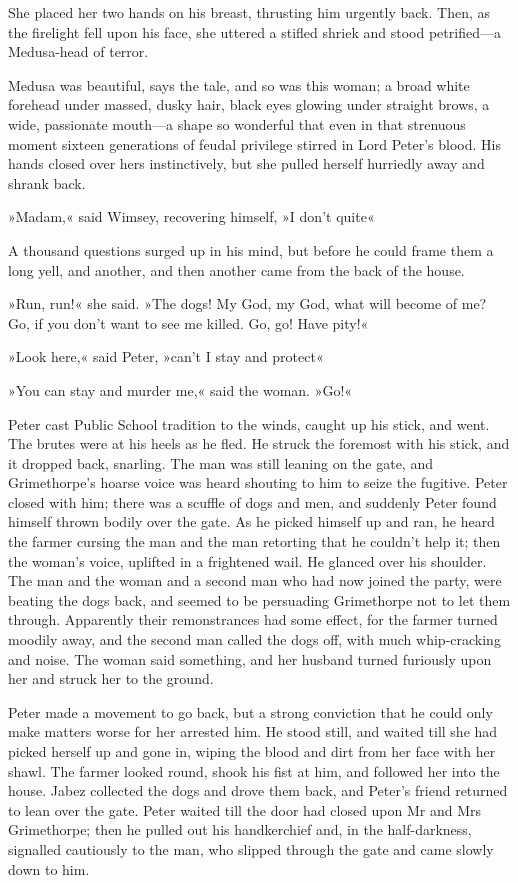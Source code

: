She placed her two hands on his breast, thrusting him urgently back.  Then, as the firelight fell upon his face, she uttered a stifled shriek and stood petrified—a Medusa-head of terror.

Medusa was beautiful, says the tale, and so was this woman; a broad white forehead under massed, dusky hair, black eyes glowing under straight brows, a wide, passionate mouth—a shape so wonderful that even in that strenuous moment sixteen generations of feudal privilege stirred in Lord Peter's blood. His hands closed over hers instinctively, but she pulled herself hurriedly away and shrank back.

»Madam,« said Wimsey, recovering himself, »I don't quite\longdash«

A thousand questions surged up in his mind, but before he could frame them a long yell, and another, and then another came from the back of the house.

»Run, run!« she said. »The dogs! My God, my God, what will become of me? Go, if you don't want to see me killed. Go, go! Have pity!«

»Look here,« said Peter, »can't I stay and protect\longdash«

»You can stay and murder me,« said the woman. »Go!«

Peter cast Public School tradition to the winds, caught up his stick, and went. The brutes were at his heels as he fled. He struck the foremost with his stick, and it dropped back, snarling. The man was still leaning on the gate, and Grimethorpe's hoarse voice was heard shouting to him to seize the fugitive. Peter closed with him; there was a scuffle of dogs and men, and suddenly Peter found himself thrown bodily over the gate. As he picked himself up and ran, he heard the farmer cursing the man and the man retorting that he couldn't help it; then the woman's voice, uplifted in a frightened wail. He glanced over his shoulder. The man and the woman and a second man who had now joined the party, were beating the dogs back, and seemed to be persuading Grimethorpe not to let them through. Apparently their remonstrances had some effect, for the farmer turned moodily away, and the second man called the dogs off, with much whip-cracking and noise. The woman said something, and her husband turned furiously upon her and struck her to the ground.

Peter made a movement to go back, but a strong conviction that he could only make matters worse for her arrested him. He stood still, and waited till she had picked herself up and gone in, wiping the blood and dirt from her face with her shawl. The farmer looked round, shook his fist at him, and followed her into the house. Jabez collected the dogs and drove them back, and Peter's friend returned to lean over the gate.
Peter waited till the door had closed upon Mr and Mrs Grimethorpe; then he pulled out his handkerchief and, in the half-darkness, signalled cautiously to the man, who slipped through the gate and came slowly down to him.

